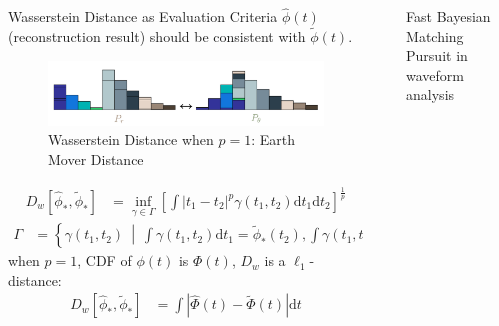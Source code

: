 \documentclass[final]{beamer}
\newlength{\sepwidth}
\newlength{\colwidth}
\newcommand{\separatorcolumn}{\begin{column}{\sepwidth}\end{column}}
\begin{document}
\begin{frame}[t]
\begin{columns}[t]
\begin{column}{\colwidth}
\begin{block}{Wasserstein Distance\cite{villani_2009} as Evaluation Criteria}
    $\hat{\phi}(t)$ (reconstruction result) should be consistent with $\tilde{\phi}(t)$. 
    \begin{figure}
      \centering
      \includegraphics[width=0.5\linewidth]{img/WD.png}
      \caption{Wasserstein Distance when $p=1$: Earth Mover Distance}  
    \end{figure}
    \begin{align*}
      D_w\left[\hat{\phi}_*, \tilde{\phi}_*\right] &= \inf_{\gamma \in \Gamma} \left[\int \left\vert t_1 - t_2 \right\vert^p \gamma(t_1, t_2)\mathrm{d}t_1\mathrm{d}t_2\right]^{\frac{1}{p}}
    \end{align*}
    \begin{align*}
      \Gamma &= \left\{\gamma(t_1, t_2) ~\middle\vert~ \int\gamma(t_1,t_2)\mathrm{d}t_1 = \tilde{\phi}_*(t_2) , \int\gamma(t_1,t_2)\mathrm{d}t_2 = \hat{\phi}_*(t_1) \right\}
    \end{align*}
    when $p=1$, CDF of $\phi(t)$ is $\Phi(t)$, $D_w$ is a $\ell_1$-distance:
    \begin{align*}
      D_w\left[\hat{\phi}_*, \tilde{\phi}_*\right] &= \int\left|\hat{\Phi}(t) - \tilde{\Phi}(t)\right| \mathrm{d}t
    \end{align*}

  \end{block}

\end{column}

\separatorcolumn

\begin{column}{\colwidth}

  \begin{block}{Fast Bayesian Matching Pursuit\cite{schniter_fast_nodate} in waveform analysis}


\end{block}
\end{column}
\end{columns}
\end{frame}
\end{document}
